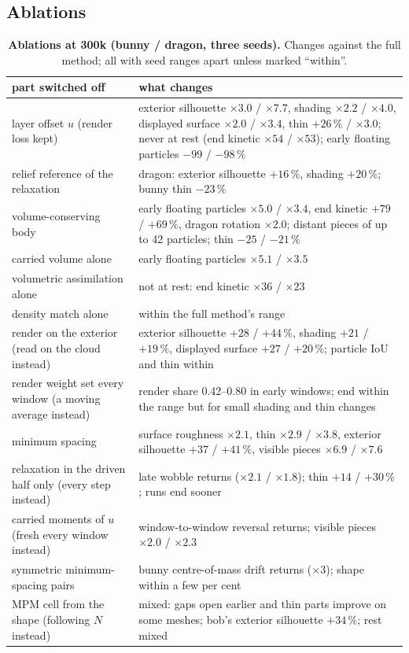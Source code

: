 \subsection{Ablations}
\begin{table}[t]
\centering
\footnotesize
\setlength{\tabcolsep}{4pt}
\caption[{Ablations at 300k (bunny / dragon, three seeds)}]{\textbf{Ablations at 300k (bunny / dragon, three seeds).} Changes against the full method; all with seed ranges
apart unless marked ``within''.}
\label{ch4:tab_ablation}
\begin{tabular}{>{\raggedright\arraybackslash}p{3.6cm}>{\raggedright\arraybackslash}p{9.8cm}}
\toprule
part switched off & what changes \\
\midrule
layer offset $u$ (render loss kept) & exterior silhouette $\times3.0$ / $\times7.7$, shading $\times2.2$ / $\times4.0$,
  displayed surface $\times2.0$ / $\times3.4$, thin $+26\,\%$ / $\times3.0$; never at rest (end kinetic $\times54$ /
  $\times53$); early floating particles $-99$ / $-98\,\%$ \\
relief reference of the relaxation & dragon: exterior silhouette $+16\,\%$, shading $+20\,\%$; bunny thin $-23\,\%$ \\
volume-conserving body & early floating particles $\times5.0$ / $\times3.4$, end kinetic $+79$ / $+69\,\%$, dragon
  rotation $\times2.0$; distant pieces of up to 42 particles; thin $-25$ / $-21\,\%$ \\
\quad carried volume alone & early floating particles $\times5.1$ / $\times3.5$ \\
\quad volumetric assimilation alone & not at rest: end kinetic $\times36$ / $\times23$ \\
\quad density match alone & within the full method's range \\
render on the exterior (read on the cloud instead) & exterior silhouette $+28$ / $+44\,\%$, shading $+21$ / $+19\,\%$,
  displayed surface $+27$ / $+20\,\%$; particle IoU and thin within \\
render weight set every window (a moving average instead) & render share 0.42--0.80 in early windows; end within the
  range but for small shading and thin changes \\
minimum spacing & surface roughness $\times2.1$, thin $\times2.9$ / $\times3.8$, exterior silhouette $+37$ / $+41\,\%$,
  visible pieces $\times6.9$ / $\times7.6$ \\
relaxation in the driven half only (every step instead) & late wobble returns ($\times2.1$ / $\times1.8$); thin $+14$ /
  $+30\,\%$; runs end sooner \\
carried moments of $u$ (fresh every window instead) & window-to-window reversal returns; visible pieces $\times2.0$ /
  $\times2.3$ \\
symmetric minimum-spacing pairs & bunny centre-of-mass drift returns ($\times3$); shape within a few per cent \\
MPM cell from the shape (following $N$ instead) & mixed: gaps open earlier and thin parts improve on some meshes; bob's
  exterior silhouette $+34\,\%$; rest mixed \\
\bottomrule
\end{tabular}
\end{table}
